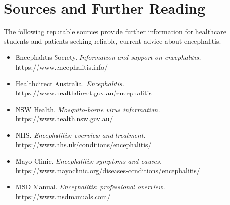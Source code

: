 \section*{Sources and Further Reading}
The following reputable sources provide further information for healthcare students and patients seeking reliable, current advice about encephalitis.
\begin{itemize}
    \item Encephalitis Society. \textit{Information and support on encephalitis.} https://www.encephalitis.info/
    \item Healthdirect Australia. \textit{Encephalitis.} https://www.healthdirect.gov.au/encephalitis
    \item NSW Health. \textit{Mosquito-borne virus information.} https://www.health.nsw.gov.au/
    \item NHS. \textit{Encephalitis: overview and treatment.} https://www.nhs.uk/conditions/encephalitis/
    \item Mayo Clinic. \textit{Encephalitis: symptoms and causes.} https://www.mayoclinic.org/diseases-conditions/encephalitis/
    \item MSD Manual. \textit{Encephalitis: professional overview.} https://www.msdmanuals.com/
\end{itemize}
